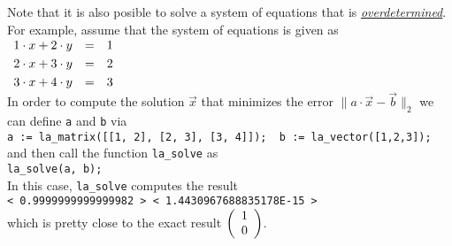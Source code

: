 Note that it is also posible to solve a system of equations that is 
\href{http://en.wikipedia.org/wiki/Overdetermined_system}{\emph{overdetermined}}.  For example,
assume that the system of equations is given as
\\[0.2cm]
\hspace*{1.3cm}
$
\begin{array}[c]{lcl}
  1 \cdot x + 2 \cdot y & = & 1 \\[0.1cm]
  2 \cdot x + 3 \cdot y & = & 2 \\[0.1cm]
  3 \cdot x + 4 \cdot y & = & 3 
\end{array}
$
\\[0.2cm]
In order to compute the solution $\vec{x}$ that minimizes the error
 $\|a \cdot \vec{x} - \vec{b}\|_2$ we can 
define \texttt{a} and \texttt{b} via
\\[0.2cm]
\hspace*{1.3cm}
\texttt{a := la\_matrix([[1, 2], [2, 3], [3, 4]]); \ b := la\_vector([1,2,3]);}
\\[0.2cm]
and then call  the function \texttt{la\_solve} as 
\\[0.2cm]
\hspace*{1.3cm}
\texttt{la\_solve(a, b);}
\\[0.2cm]
In this case, \texttt{la\_solve} computes the result
\\[0.2cm]
\hspace*{1.3cm}
\texttt{< 0.9999999999999982 >  < 1.4430967688835178E-15 >}
\\[0.2cm]
which is pretty close to the exact result $\left(\begin{array}[c]{l} 1 \\ 0 \end{array}\right)$.
\vspace*{0.3cm}

